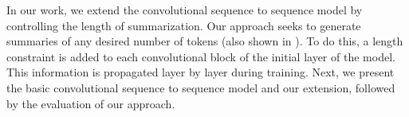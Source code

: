 In our work, we extend the convolutional sequence to sequence
model \cite{gehring2017convs2s} by
controlling the length of summarization. Our approach seeks to generate summaries
of any desired number of tokens (also shown in ).
To do this, a length constraint is added to each convolutional block
of the initial layer of the model. This information is
propagated layer by layer during training. Next, we present the basic
convolutional sequence to sequence  model and our extension, followed by the evaluation of
our approach.

